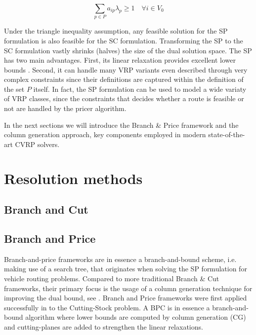 \begin{equation}\label{eq:set-covering-customers-visited-by-exactly-one-route}
	\sum_{p \in P}  a_{ip} \lambda_p \ge 1  \quad \forall i \in V_0
\end{equation}

Under the triangle inequality assumption, any feasible solution for the SP formulation is also feasible for the SC formulation.
Transforming the SP to the SC formulation vastly shrinks (halves) the size of the dual solution space.
The SP has two main advantages.
First, its linear relaxation provides excellent lower bounds \parencite{bramel1997}.
Second, it can handle many VRP variants even described
through very complex constraints
since their definitions are captured within the definition of the set $P$ itself.
In fact, the SP formulation can be used to model a wide variaty of VRP classes,
since the constraints that decides whether a route is feasible or not are handled
by the pricer algorithm.


In the next sections we will introduce the Branch \& Price framework and the column generation approach, key components employed in modern state-of-the-art CVRP solvers.



\section{Resolution methods}
\label{sec:intro-resolution-methods}

\subsection{Branch and Cut}
\label{sec:intro-branch-and-cut}


\subsection{Branch and Price}
\label{sec:intro-branch-and-price}

Branch-and-price frameworks are in essence a branch-and-bound scheme, i.e. making use of a search tree, that originates when solving the SP formulation for vehicle routing problems.
Compared to more traditional Branch \& Cut frameworks, their primary focus is the usage of a column generation technique for improving the dual bound, see \textcite{righini2008}.
Branch and Price frameworks were first applied successfully in \textcite{gilmore1961} to the Cutting-Stock problem.
A BPC is in essence a branch-and-bound algorithm where lower bounds are computed by column generation (CG) and cutting-planes are added to strengthen the linear relaxations.


